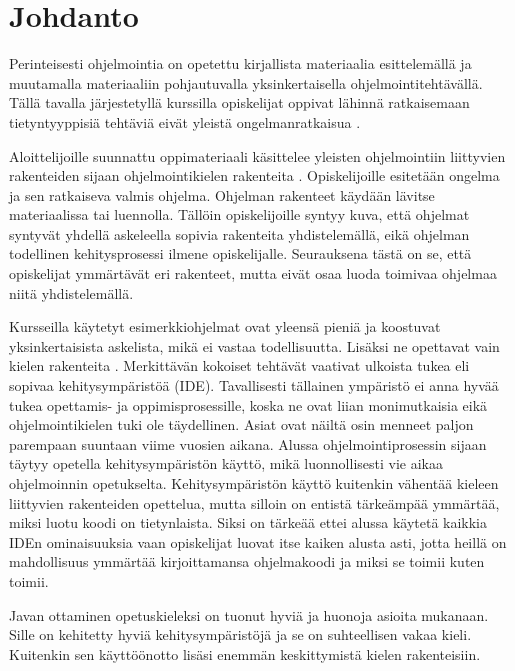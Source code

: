 \section{Johdanto}

Perinteisesti ohjelmointia on opetettu kirjallista materiaalia esittelemällä ja
muutamalla materiaaliin pohjautuvalla yksinkertaisella ohjelmointitehtävällä.
Tällä tavalla järjestetyllä kurssilla opiskelijat oppivat lähinnä ratkaisemaan
tietyntyyppisiä tehtäviä eivät yleistä ongelmanratkaisua
\cite{Gries:1974:WTI:953057.810447}.

Aloittelijoille suunnattu oppimateriaali käsittelee yleisten ohjelmointiin
liittyvien rakenteiden sijaan ohjelmointikielen rakenteita
\cite{Caspersen:2006:NPO:1176617.1176741, Vihavainen:2011:EAM:1953163.1953196}.
Opiskelijoille esitetään ongelma ja sen ratkaiseva valmis ohjelma. Ohjelman
rakenteet käydään lävitse materiaalissa tai luennolla. Tällöin opiskelijoille
syntyy kuva, että ohjelmat syntyvät yhdellä askeleella sopivia rakenteita
yhdistelemällä, eikä ohjelman todellinen kehitysprosessi ilmene opiskelijalle.
Seurauksena tästä on se, että opiskelijat ymmärtävät eri rakenteet, mutta eivät
osaa luoda toimivaa ohjelmaa niitä yhdistelemällä.

Kursseilla käytetyt esimerkkiohjelmat ovat yleensä pieniä ja koostuvat
yksinkertaisista askelista, mikä ei vastaa todellisuutta. Lisäksi ne opettavat
vain kielen rakenteita \cite{Astrachan:1995:ACA:199691.199694}. Merkittävän
kokoiset tehtävät vaativat ulkoista tukea \cite{Kolling:2008} eli sopivaa
kehitysympäristöä (IDE). Tavallisesti tällainen ympäristö ei anna hyvää tukea
opettamis- ja oppimisprosessille, koska ne ovat liian monimutkaisia eikä
ohjelmointikielen tuki ole täydellinen. Asiat ovat näiltä osin menneet paljon
parempaan suuntaan viime vuosien aikana. Alussa ohjelmointiprosessin sijaan
täytyy opetella kehitysympäristön käyttö, mikä luonnollisesti vie aikaa
ohjelmoinnin opetukselta. Kehitysympäristön käyttö kuitenkin vähentää kieleen
liittyvien rakenteiden opettelua, mutta silloin on entistä tärkeämpää ymmärtää,
miksi luotu koodi on tietynlaista. Siksi on tärkeää ettei alussa käytetä kaikkia
IDEn ominaisuuksia vaan opiskelijat luovat itse kaiken alusta asti, jotta heillä
on mahdollisuus ymmärtää kirjoittamansa ohjelmakoodi ja miksi se toimii kuten
toimii.

Javan ottaminen opetuskieleksi on tuonut hyviä ja huonoja asioita mukanaan.
Sille on kehitetty hyviä kehitysympäristöjä ja se on suhteellisen vakaa kieli.
Kuitenkin sen käyttöönotto lisäsi enemmän keskittymistä kielen rakenteisiin.

